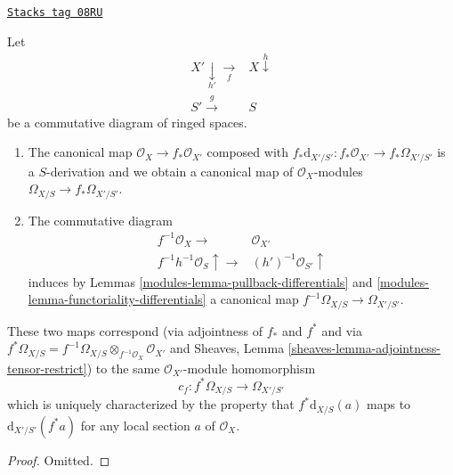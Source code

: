 \begin{lemma}
\label{modules-lemma-functoriality-differentials-ringed-spaces}
\href{https://stacks.math.columbia.edu/tag/08RU}{\texttt{Stacks tag 08RU}}

Let
$$
\begin{array}{cc}X' \underset{h'}{\downarrow}\underset{f}{\longrightarrow} & X \overset{h}{\downarrow} \\ S' \overset{g}{\longrightarrow} & S\end{array}
$$
be a commutative diagram of ringed spaces.
\begin{enumerate}
\item The canonical map $\mathcal{O}_X \to f_*\mathcal{O}_{X'}$ composed with
$f_*\text{d}_{X'/S'} : f_*\mathcal{O}_{X'} \to f_*\Omega_{X'/S'}$ is a
$S$-derivation and we obtain a canonical map of $\mathcal{O}_X$-modules
$\Omega_{X/S} \to f_*\Omega_{X'/S'}$.
\item The commutative diagram
$$
\begin{array}{cc}f^{-1}\mathcal{O}_X \longrightarrow & \mathcal{O}_{X'} \\ f^{-1}h^{-1}\mathcal{O}_S \uparrow\longrightarrow & (h')^{-1}\mathcal{O}_{S'} \uparrow\end{array}
$$
induces by Lemmas \ref{modules-lemma-pullback-differentials} and
\ref{modules-lemma-functoriality-differentials}
a canonical map $f^{-1}\Omega_{X/S} \to \Omega_{X'/S'}$.
\end{enumerate}
These two maps correspond (via adjointness of $f_*$ and $f^*$ and
via $f^*\Omega_{X/S} =
f^{-1}\Omega_{X/S} \otimes_{f^{-1}\mathcal{O}_X} \mathcal{O}_{X'}$ and
Sheaves, Lemma \ref{sheaves-lemma-adjointness-tensor-restrict})
to the same $\mathcal{O}_{X'}$-module homomorphism
$$
c_f : f^*\Omega_{X/S} \longrightarrow \Omega_{X'/S'}
$$
which is uniquely characterized by the property that
$f^*\text{d}_{X/S}(a)$ maps to $\text{d}_{X'/S'}(f^*a)$
for any local section $a$ of $\mathcal{O}_X$.
\end{lemma}

\begin{proof}
Omitted.
\end{proof}

